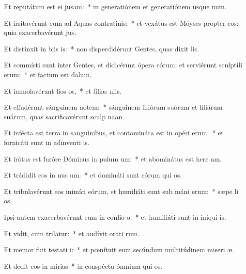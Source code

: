 \item Et reputátum est ei  jusam:~* in generatiónem et generatiónem usque  num.
\item Et irritavérunt eum ad Aquas contratinis:~* et vexátus est Móyses propter eos: quia exacerbavérunt  jus.
\item Et distínxit in biis is:~* non disperdidérunt Gentes, quas dixit  lis.
\item Et commísti sunt inter Gentes, et didicérunt ópera eórum: et serviérunt sculptíli erum:~* et factum est   dalum.
\item Et immolavérunt lios os,~* et fílias  niis.
\item Et effudérunt sánguinem notem:~* sánguinem filiórum suórum et filiárum suárum, quas sacrificavérunt sculp naan.
\item Et infécta est terra in sanguínibus, et contamináta est in opéri erum:~* et fornicáti sunt in adinventi is.
\item Et irátus est furóre Dóminus in pulum um:~* et abominátus est here am.
\item Et trádidit eos in nus um:~* et domináti sunt eórum qui  os.
\item Et tribulavérunt eos inimíci eórum, et humiliáti sunt sub máni erum:~* sæpe li os.
\item Ipsi autem exacerbavérunt eum in conlio o:~* et humiliáti sunt in iniqui is.
\item Et vidit, cum trilatur:~* et audívit orati rum.
\item Et memor fuit testati i:~* et pœnítuit eum secúndum multitúdinem miseri æ.
\item Et dedit eos in mirias~* in conspéctu ómnium qui  os.
